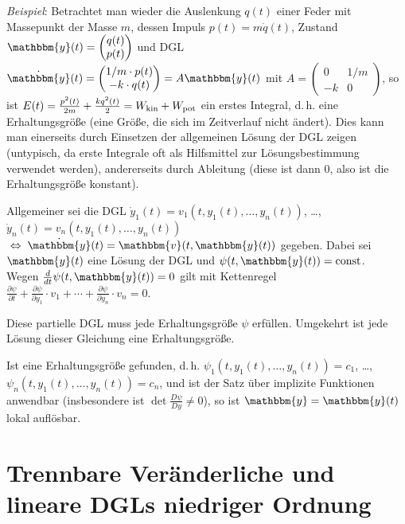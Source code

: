 \emph{Beispiel}:
Betrachtet man wieder die Auslenkung $q(t)$ einer Feder mit
Massepunkt der Masse $m$, dessen Impuls $p(t) = m \dot{q}(t)$, Zustand
$\mathbbm{y}(t) = \begin{pmatrix}q(t) \\ p(t)\end{pmatrix}$ und DGL
$\dot{\mathbbm{y}}(t)
= \begin{pmatrix}1/m \cdot p(t) \\ -k \cdot q(t)\end{pmatrix} =
A \mathbbm{y}(t)$ mit $A = \begin{pmatrix}0 & 1/m \\ -k & 0\end{pmatrix}$,
so ist $E(t) = \frac{p^2(t)}{2m} + \frac{kq^2(t)}{2} = W_{{\operatorname{kin}}} + W_{{\operatorname{pot}}}$
ein erstes Integral, d.\,h.
eine Erhaltungsgröße (eine Größe, die sich im Zeitverlauf nicht ändert).
Dies kann man einerseits durch Einsetzen der allgemeinen Lösung der DGL
zeigen (untypisch, da erste Integrale oft als Hilfsmittel zur Lösungsbestimmung
verwendet werden), andererseits durch Ableitung (diese ist dann $0$, also
ist die Erhaltungsgröße konstant).

Allgemeiner sei die DGL
$\dot{y}_1(t) = v_1(t, y_1(t), \dotsc, y_n(t))$, \dots,
$\dot{y}_n(t) = v_n(t, y_1(t), \dotsc, y_n(t))$
$\;\Leftrightarrow\; \dot{\mathbbm{y}}(t) = \mathbbm{v}(t, \mathbbm{y}(t))$
gegeben.
Dabei sei $\mathbbm{y}(t)$ eine Lösung der DGL und
$\psi(t, \mathbbm{y}(t)) = \const$. \\
Wegen $\frac{d}{dt} \psi(t, \mathbbm{y}(t)) = 0$
gilt mit Kettenregel
$\frac{\partial \psi}{\partial t} +
\frac{\partial \psi}{\partial y_1} \cdot v_1 +
\dotsb + \frac{\partial \psi}{\partial y_n} \cdot v_n = 0$.

Diese partielle DGL muss jede Erhaltungsgröße $\psi$ erfüllen.
Umgekehrt ist jede Lösung dieser Gleichung eine Erhaltungsgröße.

Ist eine Erhaltungsgröße gefunden, d.\,h.
$\psi_1(t, y_1(t), \dotsc, y_n(t)) = c_1$, \dots, \\
$\psi_n(t, y_1(t), \dotsc, y_n(t)) = c_n$,
und ist der Satz über implizite Funktionen anwendbar
(insbesondere ist $\det \frac{D \psi}{D y} \not= 0$), so ist
$\mathbbm{y} = \mathbbm{y}(t)$ lokal auflösbar.

\pagebreak

\section{%
    Trennbare Veränderliche und lineare DGLs niedriger Ordnung%
}

